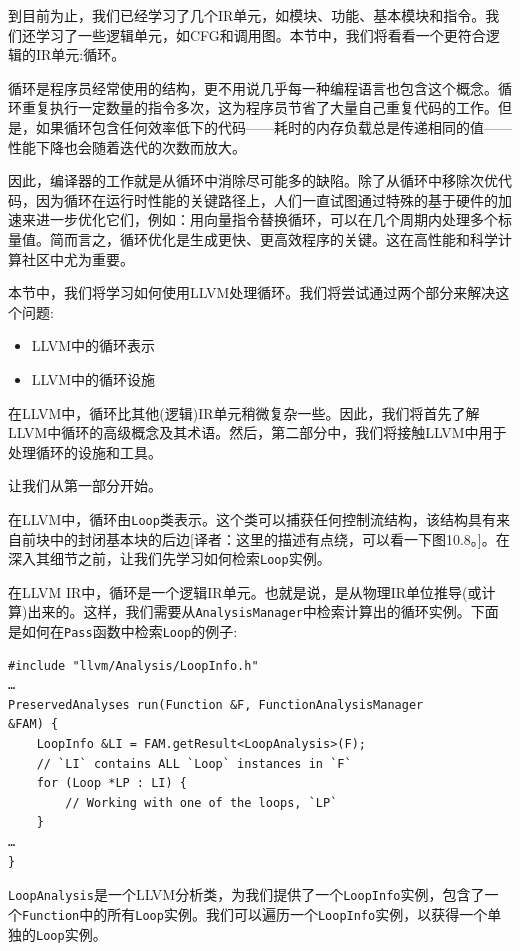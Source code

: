 
到目前为止，我们已经学习了几个IR单元，如模块、功能、基本模块和指令。我们还学习了一些逻辑单元，如CFG和调用图。本节中，我们将看看一个更符合逻辑的IR单元:循环。

循环是程序员经常使用的结构，更不用说几乎每一种编程语言也包含这个概念。循环重复执行一定数量的指令多次，这为程序员节省了大量自己重复代码的工作。但是，如果循环包含任何效率低下的代码——耗时的内存负载总是传递相同的值——性能下降也会随着迭代的次数而放大。

因此，编译器的工作就是从循环中消除尽可能多的缺陷。除了从循环中移除次优代码，因为循环在运行时性能的关键路径上，人们一直试图通过特殊的基于硬件的加速来进一步优化它们，例如：用向量指令替换循环，可以在几个周期内处理多个标量值。简而言之，循环优化是生成更快、更高效程序的关键。这在高性能和科学计算社区中尤为重要。

本节中，我们将学习如何使用LLVM处理循环。我们将尝试通过两个部分来解决这个问题:

\begin{itemize}
\item LLVM中的循环表示
\item LLVM中的循环设施
\end{itemize}

在LLVM中，循环比其他(逻辑)IR单元稍微复杂一些。因此，我们将首先了解LLVM中循环的高级概念及其术语。然后，第二部分中，我们将接触LLVM中用于处理循环的设施和工具。

让我们从第一部分开始。


在LLVM中，循环由\texttt{Loop}类表示。这个类可以捕获任何控制流结构，该结构具有来自前块中的封闭基本块的后边[译者：这里的描述有点绕，可以看一下图10.8。]。在深入其细节之前，让我们先学习如何检索\texttt{Loop}实例。

在LLVM IR中，循环是一个逻辑IR单元。也就是说，是从物理IR单位推导(或计算)出来的。这样，我们需要从\texttt{AnalysisManager}中检索计算出的循环实例。下面是如何在\texttt{Pass}函数中检索\texttt{Loop}的例子:

\begin{lstlisting}[style=styleCXX]
#include "llvm/Analysis/LoopInfo.h"
…
PreservedAnalyses run(Function &F, FunctionAnalysisManager
&FAM) {
	LoopInfo &LI = FAM.getResult<LoopAnalysis>(F);
	// `LI` contains ALL `Loop` instances in `F`
	for (Loop *LP : LI) {
		// Working with one of the loops, `LP`
	}
…
}
\end{lstlisting}

\texttt{LoopAnalysis}是一个LLVM分析类，为我们提供了一个\texttt{LoopInfo}实例，包含了一个\texttt{Function}中的所有\texttt{Loop}实例。我们可以遍历一个\texttt{LoopInfo}实例，以获得一个单独的\texttt{Loop}实例。

